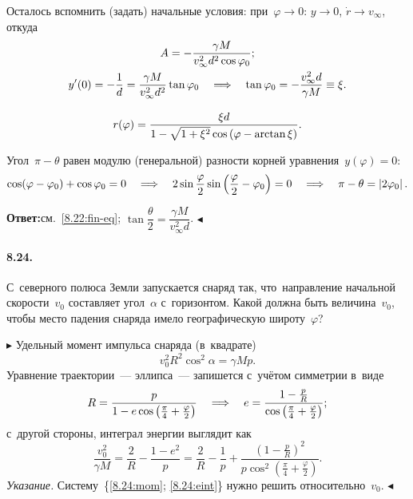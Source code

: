 \documentclass{weekly}
\begin{document}
Осталось вспомнить (задать) начальные условия:
при~$\varphi \to 0$: $y \to 0$, $\dot r \to v_\infty$, откуда
\begin{gather}
    A = -\frac{\gamma M}{v_\infty^2 d^2 \cos\varphi_0}; \\
    y'(0) = -\frac{1}{d} = \frac{\gamma M}{v_\infty^2 d^2} \tan\varphi_0
        \quad \Longrightarrow \quad \tan\varphi_0 = -\frac{v_\infty^2 d}{\gamma M}
        \equiv \xi. \\[2ex]
    r(\varphi) = \frac{\xi d}{1 - \sqrt{1 + \xi^2}
            \cos\left(\varphi - \arctan\xi\right)}.
        \label{8.22:fin-eq}
\end{gather}

Угол~$\pi - \theta$ равен модулю (генеральной) разности корней
уравнения~$y(\varphi) = 0$:
\begin{gather}
    \cos(\varphi - \varphi_0) + \cos\varphi_0 = 0
    \quad \Longrightarrow \quad
    2 \sin\frac{\varphi}{2}
        \sin\left(\frac{\varphi}{2} - \varphi_0\right) = 0
    \quad \Longrightarrow \quad
    \pi - \theta = \left| 2\varphi_0 \right|.
\end{gather}

\textbf{Ответ:}\qquad см.~\eqref{8.22:fin-eq}; \quad
$\tan\dfrac{\theta}{2} = \dfrac{\gamma M}{v_\infty^2 d}$.
\hfill $\blacktriangleleft$


\paragraph{8.24.} С~северного полюса Земли запускается снаряд так,
что~направление начальной скорости~$v_0$ составляет угол~$\alpha$
с~горизонтом. Какой должна быть величина~$v_0$, чтобы место
падения снаряда имело географическую широту~$\varphi$?

$\blacktriangleright$ Удельный момент импульса снаряда (в~квадрате)
\begin{equation}
    v_0^2 R^2 \cos^2\alpha = \gamma M p.
    \label{8.24:mom}
\end{equation}
Уравнение траектории~--- эллипса~--- запишется с~учётом симметрии
в~виде
\begin{equation}
    R = \frac{p}{1 - e\cos\left(
        \frac{\pi}{4} + \frac{\varphi}{2}\right)}
    \quad \Longrightarrow \quad e = \frac{1 - \frac{p}{R}}{\cos\left(
        \frac{\pi}{4} + \frac{\varphi}{2}\right)};
\end{equation}
с~другой стороны, интеграл энергии выглядит как
\begin{equation}
    \frac{v_0^2}{\gamma M}
        = \frac{2}{R} - \frac{1-e^2}{p}
        = \frac{2}{R} - \frac{1}{p} +
            \frac{\left(1 - \frac{p}{R}\right)^2}
            {p \cos^2\left(
            \frac{\pi}{4} + \frac{\varphi}{2}\right)}.
    \label{8.24:eint}
\end{equation}
\textsl{Указание.} Систему~\{\eqref{8.24:mom}; \eqref{8.24:eint}\}
нужно решить относительно~$v_0$.
\hfill $\blacktriangleleft$
\end{document}

